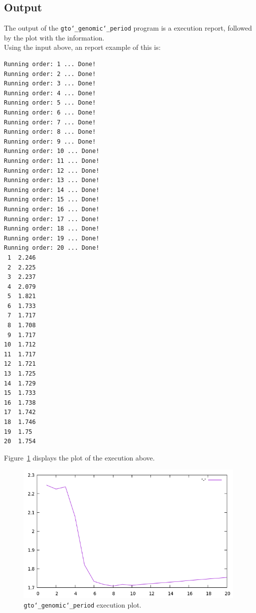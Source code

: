 \subsection*{Output}
The output of the \texttt{gto\char`_genomic\char`_period} program is a execution report, followed by the plot with the information.\\
Using the input above, an report example of this is:
\begin{lstlisting}
Running order: 1 ... Done!
Running order: 2 ... Done!
Running order: 3 ... Done!
Running order: 4 ... Done!
Running order: 5 ... Done!
Running order: 6 ... Done!
Running order: 7 ... Done!
Running order: 8 ... Done!
Running order: 9 ... Done!
Running order: 10 ... Done!
Running order: 11 ... Done!
Running order: 12 ... Done!
Running order: 13 ... Done!
Running order: 14 ... Done!
Running order: 15 ... Done!
Running order: 16 ... Done!
Running order: 17 ... Done!
Running order: 18 ... Done!
Running order: 19 ... Done!
Running order: 20 ... Done!
 1	2.246
 2	2.225
 3	2.237
 4	2.079
 5	1.821
 6	1.733
 7	1.717
 8	1.708
 9	1.717
10	1.712
11	1.717
12	1.721
13	1.725
14	1.729
15	1.733
16	1.738
17	1.742
18	1.746
19	1.75
20	1.754
\end{lstlisting}

Figure~\ref{fig:gtoGenomicPeriod} displays the plot of the execution above.

 \begin{figure}[!h]
  \centering
  \includegraphics[scale=0.7]{./images/gto_genomic_period.png}
  \caption{\texttt{gto\char`_genomic\char`_period} execution plot.}
  \label{fig:gtoGenomicPeriod}
 \end{figure}